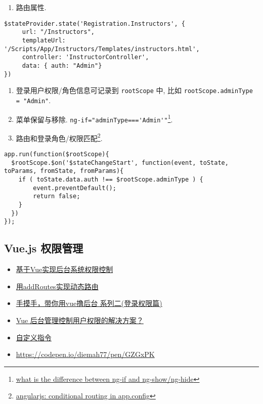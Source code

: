 \begin{enumerate}
\def\labelenumi{\arabic{enumi}.}
\tightlist
\item
  路由属性.
\end{enumerate}

\begin{lstlisting}
$stateProvider.state('Registration.Instructors', {
     url: "/Instructors",
     templateUrl: '/Scripts/App/Instructors/Templates/instructors.html',
     controller: 'InstructorController',
     data: { auth: "Admin"}
})
\end{lstlisting}

\begin{enumerate}
\def\labelenumi{\arabic{enumi}.}
\setcounter{enumi}{1}
\tightlist
\item
  登录用户权限/角色信息可记录到 \lstinline!rootScope! 中, 比如
  \lstinline!rootScope.adminType = "Admin"!.
\item
  菜单保留与移除. \lstinline!ng-if="adminType==='Admin'"!\footnote{\href{http://stackoverflow.com/questions/19177732/what-is-the-difference-between-ng-if-and-ng-show-ng-hide}{what
    is the difference between ng-if and ng-show/ng-hide}}.
\item
  路由和登录角色/权限匹配\footnote{\href{http://stackoverflow.com/questions/20978248/angularjs-conditional-routing-in-app-config}{angularjs:
    conditional routing in app.config}}.
\end{enumerate}

\begin{lstlisting}
app.run(function($rootScope){
  $rootScope.$on('$stateChangeStart', function(event, toState, toParams, fromState, fromParams){
    if ( toState.data.auth !== $rootScope.adminType ) {
        event.preventDefault();
        return false;
    }
  })
});
\end{lstlisting}

\subsection{Vue.js 权限管理}\label{vue.js-ux6743ux9650ux7ba1ux7406}

\begin{itemize}
\tightlist
\item
  \href{http://refined-x.com/2017/08/29/\%E5\%9F\%BA\%E4\%BA\%8EVue\%E5\%AE\%9E\%E7\%8E\%B0\%E5\%90\%8E\%E5\%8F\%B0\%E7\%B3\%BB\%E7\%BB\%9F\%E6\%9D\%83\%E9\%99\%90\%E6\%8E\%A7\%E5\%88\%B6/}{基于Vue实现后台系统权限控制}
\item
  \href{http://refined-x.com/2017/09/01/\%E7\%94\%A8addRoutes\%E5\%AE\%9E\%E7\%8E\%B0\%E5\%8A\%A8\%E6\%80\%81\%E8\%B7\%AF\%E7\%94\%B1/}{用addRoutes实现动态路由}
\item
  \href{https://juejin.im/post/591aa14f570c35006961acac}{手摸手，带你用vue撸后台
  系列二(登录权限篇)}
\item
  \href{https://www.zhihu.com/question/58991978}{Vue
  后台管理控制用户权限的解决方案？}
\item
  \href{https://cn.vuejs.org/v2/guide/custom-directive.html}{自定义指令}
\item
  \url{https://codepen.io/diemah77/pen/GZGxPK}
\end{itemize}

